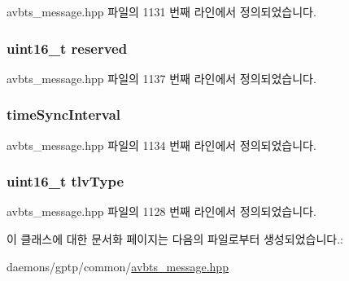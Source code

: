 avbts\+\_\+message.\+hpp 파일의 1131 번째 라인에서 정의되었습니다.

\subsubsection[{\texorpdfstring{reserved}{reserved}}]{\setlength{\rightskip}{0pt plus 5cm}uint16\+\_\+t reserved\hspace{0.3cm}{\ttfamily [private]}}\hypertarget{class_signalling_t_l_v_a5a6ed8c04a3db86066924b1a1bf4dad3}{}\label{class_signalling_t_l_v_a5a6ed8c04a3db86066924b1a1bf4dad3}


avbts\+\_\+message.\+hpp 파일의 1137 번째 라인에서 정의되었습니다.

\subsubsection[{\texorpdfstring{time\+Sync\+Interval}{timeSyncInterval}}]{ time\+Sync\+Interval\hspace{0.3cm}{\ttfamily [private]}}\hypertarget{class_signalling_t_l_v_a322abfc3cef9e3c3f4db4ef568a5e839}{}\label{class_signalling_t_l_v_a322abfc3cef9e3c3f4db4ef568a5e839}


avbts\+\_\+message.\+hpp 파일의 1134 번째 라인에서 정의되었습니다.

\subsubsection[{\texorpdfstring{tlv\+Type}{tlvType}}]{\setlength{\rightskip}{0pt plus 5cm}uint16\+\_\+t tlv\+Type\hspace{0.3cm}{\ttfamily [private]}}\hypertarget{class_signalling_t_l_v_a90baf0e86e13da82746e3aab1436388b}{}\label{class_signalling_t_l_v_a90baf0e86e13da82746e3aab1436388b}


avbts\+\_\+message.\+hpp 파일의 1128 번째 라인에서 정의되었습니다.



이 클래스에 대한 문서화 페이지는 다음의 파일로부터 생성되었습니다.\+:\begin{DoxyCompactItemize}
\item 
daemons/gptp/common/\hyperlink{avbts__message_8hpp}{avbts\+\_\+message.\+hpp}\end{DoxyCompactItemize}
